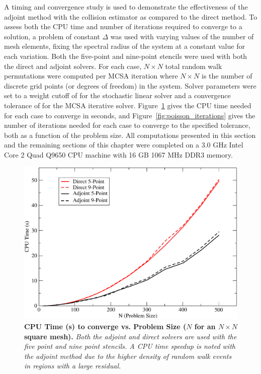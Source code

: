 A timing and convergence study is used to demonstrate the
effectiveness of the adjoint method with the collision estimator as
compared to the direct method. To assess both the CPU time and number
of iterations required to converge to a solution, a problem of
constant $\Delta$ was used with varying values of the number of mesh
elements, fixing the spectral radius of the system at a constant value
for each variation. Both the five-point and nine-point stencils were
used with both the direct and adjoint solvers. For each case, $N
\times N$ total random walk permutations were computed per MCSA
iteration where $N \times N$ is the number of discrete grid points (or
degrees of freedom) in the system. Solver parameters were set to a
weight cutoff of  for the stochastic linear solver and a
convergence tolerance of  for the MCSA iterative solver.
Figure~\ref{fig:poisson_cpu_time} gives the CPU time needed for each
case to converge in seconds, and Figure~\ref{fig:poisson_iterations}
gives the number of iterations needed for each case to converge to the
specified tolerance, both as a function of the problem size. All
computations presented in this section and the remaining sections of
this chapter were completed on a 3.0 GHz Intel Core 2 Quad Q9650 CPU
machine with 16 GB 1067 MHz DDR3 memory.
\begin{figure}[t!]
  \centering
  \includegraphics[width=5in,clip]{chapters/mc_background/dir_adj_cpu.pdf}
  \caption{\textbf{CPU Time (s) to converge vs. Problem Size ($N$ for
      an $N \times N$ square mesh).} \textit{Both the adjoint and
      direct solvers are used with the five point and nine point
      stencils. A CPU time speedup is noted with the adjoint method
      due to the higher density of random walk events in regions with
      a large residual.}}
  \label{fig:poisson_cpu_time}
\end{figure}

